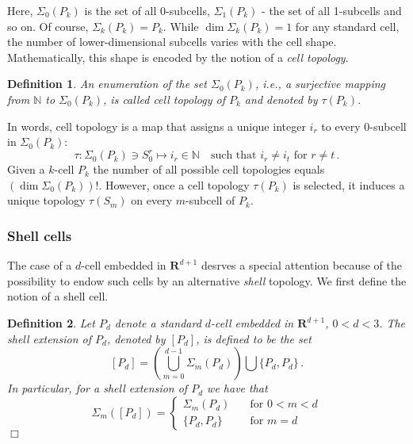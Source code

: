 \documentclass[pdf,12pt,relaxed]{SANDreport}
\newtheorem{defin}{Definition}
\begin{document}
    Here, $\Sigma_0(P_k)$ is the set of all $0$-subcells, $\Sigma_1(P_k)$ - the set of all 1-subcells and so on. Of course, $\Sigma_k(P_k) = P_k$. While $\dim \Sigma_k(P_k) = 1$ for any standard cell, the number of lower-dimensional subcells varies with the cell shape. Mathematically, this shape is encoded by the notion of a \emph{cell topology}.
    

    \begin{defin}\label{def:cell-topo}
    An enumeration of the set $\Sigma_0(P_k)$, i.e., a surjective mapping from $\mathbb{N}$ to $\Sigma_0(P_k)$, is called cell topology of $P_k$ and denoted by $\tau(P_k)$. 
    \end{defin}
    
    In words, cell topology is a map that assigns a unique integer $i_r$ to every $0$-subcell in $\Sigma_0(P_k)$:
    $$
    \tau: \Sigma_0(P_k)\ni S_0^{r} \mapsto i_r\in \mathbb{N}\quad \mbox{such that $i_r\neq i_t$ for $r\neq t$} \,.
    $$
    Given a $k$-cell $P_k$ the number of all possible cell topologies equals $(\dim \Sigma_0(P_k))!$. However, once a cell topology $\tau(P_k)$ is selected, it induces a unique topology $\tau(S_m)$ on every $m$-subcell of $P_k$. 
    
    
    \subsubsection{Shell cells}
    The case of a $d$-cell embedded in $\mathbf{R}^{d+1}$ desrves a special attention because of the possibility to endow such cells by an alternative \emph{shell} topology. We first define the notion of a shell cell.
    
    \begin{defin}\label{def:shell-cell}
    Let $P_d$ denote a standard $d$-cell embedded in $\mathbf{R}^{d+1}$, $0<d<3$. The shell extension of $P_d$, denoted by $[P_d]$, is defined to be the set
    \begin{equation}\label{eq:shell-cell}
    [P_d] = \left(\bigcup_{m=0}^{d-1} \Sigma_m(P_d) \right) \bigcup \{P_d, P_d\} \,.
    \end{equation}
    In particular, for a shell extension of $P_d$ we have that
    $$
    \Sigma_m([P_d]) = 
    \left\{
    \begin{array}{rl}  
    \displaystyle \Sigma_m(P_d) & \quad\mbox{for $0<m<d$} \\[1ex]
    \displaystyle \{P_d, P_d\}       & \quad\mbox{for $m=d$}
    \end{array}\right.
    $$
    \hfill $\Box$
    \end{defin}
    
\end{document}
